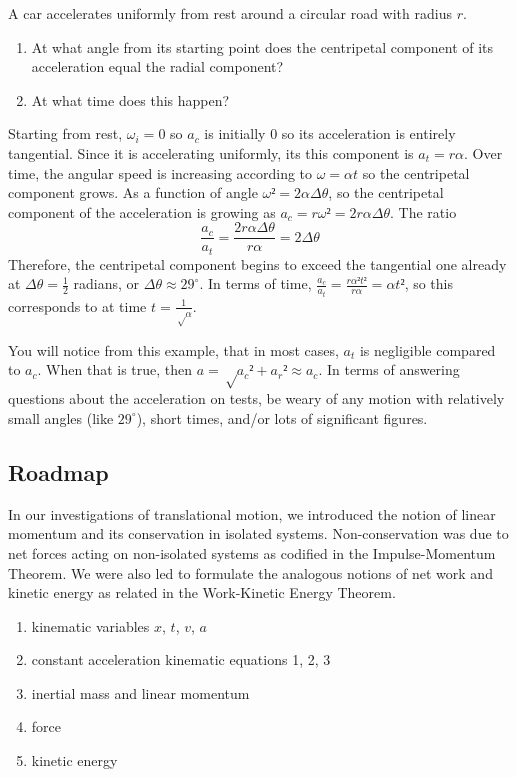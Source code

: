 \begin{example} 
A car accelerates uniformly from rest around a circular road with radius $r$. 
\begin{enumerate}
	\item At what angle from its starting point does the centripetal component of its acceleration equal the radial component?
	\item At what time does this happen?
\end{enumerate}
\begin{solution}
Starting from rest, $ω_i =0$ so $a_c$ is initially 0 so its acceleration is entirely tangential. Since it is accelerating uniformly, its this component is $a_t = rα$. Over time, the angular speed is increasing according to $ω = α t$ so the centripetal component grows. As a function of angle $ω² = 2α Δθ$, so the centripetal component of the acceleration is growing as $a_c= rω² = 2rα Δθ$. The ratio
$$
\frac{a_c}{a_t} = \frac {2rα Δθ}{rα} = 2Δθ
$$
Therefore, the centripetal component begins to exceed the tangential one already at $Δθ =\frac12$ radians, or $Δθ ≈ 29^∘$.
In terms of time, $\frac{a_c}{a_t} = \frac {rα² t²}{rα} = αt²$, so this corresponds to at time $t=\frac1{√α}$.
\end{solution}
\end{example}
You will notice from this example, that in most cases, $a_t$ is negligible compared to $a_c$. When that is true, then $a=√{a_c² +a_r²} ≈ a_c$. In terms of answering questions about the acceleration on tests, be weary of any motion with relatively small angles (like $29^∘$), short times, and/or lots of significant figures. 

\subsection{Roadmap}
In our investigations of translational motion, we introduced the notion of linear momentum and its conservation in isolated systems. Non-conservation was due to net forces acting on non-isolated systems as codified in the Impulse-Momentum Theorem. We were also led to formulate the analogous notions of net work and kinetic energy as related in the Work-Kinetic Energy Theorem. 
\begin{enumerate}
\item kinematic variables $x$, $t$, $v$, $a$
\item constant acceleration kinematic equations 1, 2, 3
\item inertial mass and linear momentum
\item force
\item kinetic energy 
\end{enumerate}

